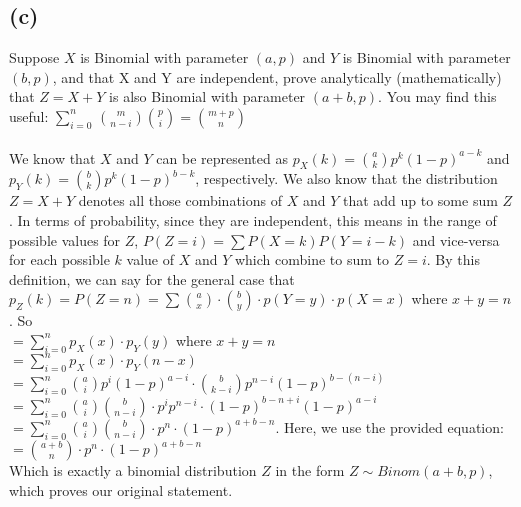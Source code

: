 \documentclass{article}
\begin{document}
{\subsection*{(c)}
Suppose $X$ is Binomial with parameter $(a,p)$ and $Y$ is Binomial with parameter $(b,p)$, and that X and Y are independent, prove analytically (mathematically) that  $Z=X+Y$ is also Binomial with parameter $(a+b,p).$ You may find this useful: $\sum_{i=0}^{n}\,{{ m}\choose{n- i}}{ p\choose i } = {{m+p}\choose n}$ \\ \\
We know that $X$ and $Y$ can be represented as $p_X (k) = \binom{a}{k}p^k(1-p)^{a-k}$ and $p_Y (k) = \binom{b}{k}p^k(1-p)^{b-k}$, respectively. We also know that the distribution $Z = X + Y$ denotes all those combinations of $X$ and $Y$ that add up to some sum $Z$. In terms of probability, since they are independent, this means in the range of possible values for $Z$, $P(Z = i) = \sum P(X = k)P(Y = i - k)$ and vice-versa for each possible $k$ value of $X$ and $Y$ which combine to sum to $Z = i$. By this definition, we can say for the general case that \\ 
$p_Z (k) = P(Z = n) = \sum_{} \binom{a}{x} \cdot \binom{b}{y} \cdot p(Y = y) \cdot p(X = x)$ where $x + y = n$. So \\
$= \sum_{i=0}^{n} p_X(x) \cdot p_Y(y)$ where $x + y = n$ \\
$= \sum_{i=0}^{n} p_X(x) \cdot p_Y(n - x)$ \\
$= \sum_{i=0}^{n} \binom{a}{i} p^i(1-p)^{a-i} \cdot \binom{b}{k - i} p^{n-i}(1-p)^{b - (n-i)}$ \\
$= \sum_{i=0}^{n} \binom{a}{i} \binom{b}{n - i} \cdot p^i p^{n-i} \cdot (1-p)^{b - n + i} (1-p)^{a-i}$ \\
$= \sum_{i=0}^{n} \binom{a}{i} \binom{b}{n - i} \cdot p^n \cdot (1-p)^{a + b - n}$.    Here, we use the provided equation: \\
$= \binom{a + b}{n} \cdot p^n \cdot (1-p)^{a + b - n}$ \\
Which is exactly a binomial distribution $Z$ in the form $Z \sim Binom(a + b, p)$, which proves our original statement.

}
\end{document}
